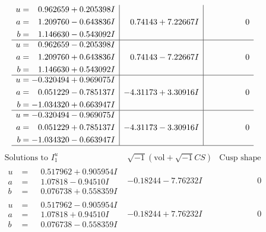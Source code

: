 \documentclass[1p]{elsarticle_modified}
\theoremstyle{definition}
\newcommand{\I}{\sqrt{-1}}
\begin{document}
$$\begin{array}{c|c|c}
\begin{aligned}
u &= \phantom{-}0.962659 + 0.205398 I \\
a &= \phantom{-}1.209760 - 0.643836 I \\
b &= \phantom{-}1.146630 - 0.543092 I\end{aligned}
 & \phantom{-}0.74143 + 7.22667 I & \phantom{-0.000000 } 0 \\ \hline\begin{aligned}
u &= \phantom{-}0.962659 - 0.205398 I \\
a &= \phantom{-}1.209760 + 0.643836 I \\
b &= \phantom{-}1.146630 + 0.543092 I\end{aligned}
 & \phantom{-}0.74143 - 7.22667 I & \phantom{-0.000000 } 0 \\ \hline\begin{aligned}
u &= -0.320494 + 0.969075 I \\
a &= \phantom{-}0.051229 - 0.785137 I \\
b &= -1.034320 + 0.663947 I\end{aligned}
 & -4.31173 + 3.30916 I & \phantom{-0.000000 } 0 \\ \hline\begin{aligned}
u &= -0.320494 - 0.969075 I \\
a &= \phantom{-}0.051229 + 0.785137 I \\
b &= -1.034320 - 0.663947 I\end{aligned}
 & -4.31173 - 3.30916 I & \phantom{-0.000000 } 0\\
 \hline 
 \end{array}$$\newpage$$\begin{array}{c|c|c}  
\text{Solutions to }I^u_{1}& \I (\text{vol} + \sqrt{-1}CS) & \text{Cusp shape}\\
 \hline 
\begin{aligned}
u &= \phantom{-}0.517962 + 0.905954 I \\
a &= \phantom{-}1.07818 - 0.94510 I \\
b &= \phantom{-}0.076738 + 0.558359 I\end{aligned}
 & -0.18244 - 7.76232 I & \phantom{-0.000000 } 0 \\ \hline\begin{aligned}
u &= \phantom{-}0.517962 - 0.905954 I \\
a &= \phantom{-}1.07818 + 0.94510 I \\
b &= \phantom{-}0.076738 - 0.558359 I\end{aligned}
 & -0.18244 + 7.76232 I & \phantom{-0.000000 } 0 \\ \hline\begin{aligned}

\end{aligned}
\end{array}$$
\end{document}
